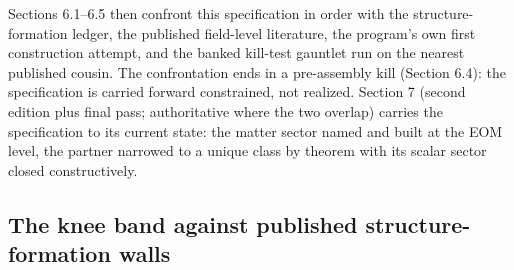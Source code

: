 \documentclass[11pt,a4paper]{article}
\begin{document}
Sections 6.1--6.5 then confront this specification in order with the structure-formation ledger, the published field-level literature, the program's own first construction attempt, and the banked kill-test gauntlet run on the nearest published cousin. The confrontation ends in a pre-assembly kill (Section 6.4): the specification is carried forward constrained, not realized. Section 7 (second edition plus final pass; authoritative where the two overlap) carries the specification to its current state: the matter sector named and built at the EOM level, the partner narrowed to a unique class by theorem with its scalar sector closed constructively.

\subsection{The knee band against published structure-formation walls}
\end{document}
